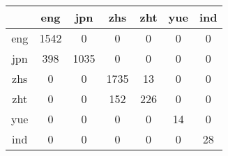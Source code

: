 \documentclass{article}
\begin{document}
\centering
\begin{table}[!h]

\begin{tabular}{|c|c|c|c|c|c|c|}
\hline 

& eng & jpn & zhs & zht & yue & ind \\
\hline 
eng & 1542 & 0 & 0 & 0 & 0 & 0 \\
\hline 
jpn & 398 & 1035 & 0 & 0 & 0 & 0 \\
\hline 
zhs & 0 & 0 & 1735 & 13 & 0 & 0 \\
\hline 
zht & 0 & 0 & 152 & 226 & 0 & 0 \\
\hline 
yue & 0 & 0 & 0 & 0 & 14 & 0 \\
\hline 
ind & 0 & 0 & 0 & 0 & 0 & 28 \\
\hline

\end{tabular}
\end{table}
\end{document}
